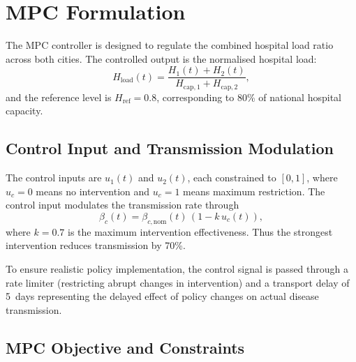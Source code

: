\section{MPC Formulation}
\label{sec:mpc_form}

The MPC controller is designed to regulate the combined hospital load ratio across both cities.
The controlled output is the normalised hospital load:
\begin{equation}
  H_{\mathrm{load}}(t) = \frac{H_1(t) + H_2(t)}{H_{\mathrm{cap},1} + H_{\mathrm{cap},2}},
\end{equation}
and the reference level is $H_{\mathrm{ref}} = 0.8$, corresponding to 80\% of national hospital capacity.

\subsection{Control Input and Transmission Modulation}
\label{sec:control_input}

The control inputs are $u_1(t)$ and $u_2(t)$, each constrained to $[0, 1]$, where $u_c = 0$ means no intervention and $u_c = 1$ means maximum restriction.
The control input modulates the transmission rate through
\begin{equation}
  \beta_c(t) = \beta_{c,\mathrm{nom}}(t)\,(1 - k\,u_c(t)),
  \label{eq:beta_control}
\end{equation}
where $k = 0.7$ is the maximum intervention effectiveness.
Thus the strongest intervention reduces transmission by 70\%.

To ensure realistic policy implementation, the control signal is passed through a rate limiter (restricting abrupt changes in intervention) and a transport delay of 5~days representing the delayed effect of policy changes on actual disease transmission.

\subsection{MPC Objective and Constraints}
\label{sec:mpc_objective}

